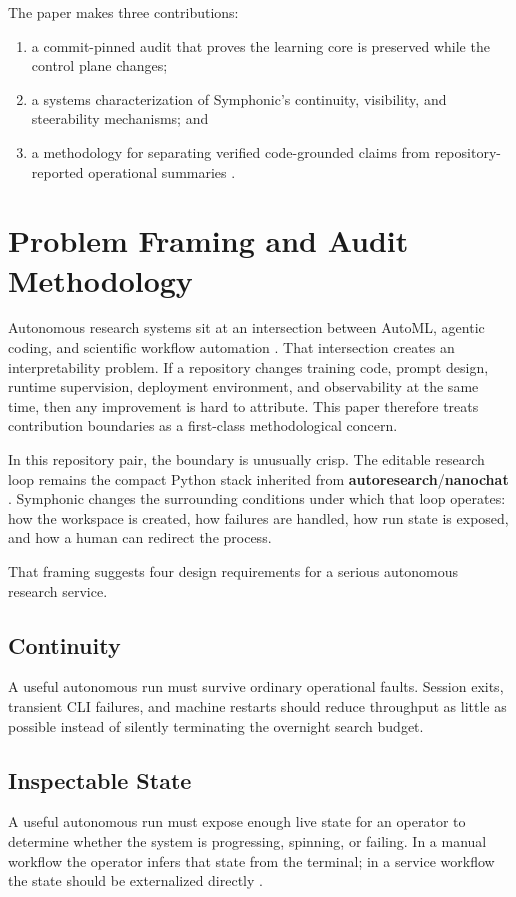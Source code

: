 \documentclass[conference]{IEEEtran}
\newcommand{\file}[1]{{\ttfamily\bfseries\textcolor{accentteal}{#1}}}
\begin{document}
The paper makes three contributions:
\begin{enumerate}
\item a commit-pinned audit that proves the learning core is preserved while the control plane changes;
\item a systems characterization of Symphonic's continuity, visibility, and steerability mechanisms; and
\item a methodology for separating verified code-grounded claims from repository-reported operational summaries \cite{ref_bouthillier}.
\end{enumerate}

\section{Problem Framing and Audit Methodology}
Autonomous research systems sit at an intersection between AutoML, agentic coding, and scientific workflow automation \cite{ref_automl,ref_agentlab,ref_aiscientist}. That intersection creates an interpretability problem. If a repository changes training code, prompt design, runtime supervision, deployment environment, and observability at the same time, then any improvement is hard to attribute. This paper therefore treats contribution boundaries as a first-class methodological concern.

In this repository pair, the boundary is unusually crisp. The editable research loop remains the compact Python stack inherited from \file{autoresearch}/\file{nanochat} \cite{ref_autoresearch,ref_nanochat}. Symphonic changes the surrounding conditions under which that loop operates: how the workspace is created, how failures are handled, how run state is exposed, and how a human can redirect the process.

That framing suggests four design requirements for a serious autonomous research service.

\subsection{Continuity}
A useful autonomous run must survive ordinary operational faults. Session exits, transient CLI failures, and machine restarts should reduce throughput as little as possible instead of silently terminating the overnight search budget.

\subsection{Inspectable State}
A useful autonomous run must expose enough live state for an operator to determine whether the system is progressing, spinning, or failing. In a manual workflow the operator infers that state from the terminal; in a service workflow the state should be externalized directly \cite{ref_ml_test_score}.
\end{document}

